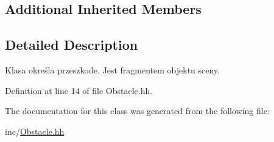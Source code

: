 \subsection*{Additional Inherited Members}


\subsection{Detailed Description}
Klasa określa przeszkode. Jest fragmentem objektu sceny. 

Definition at line 14 of file Obstacle.\+hh.



The documentation for this class was generated from the following file\+:\begin{DoxyCompactItemize}
\item 
inc/\hyperlink{_obstacle_8hh}{Obstacle.\+hh}\end{DoxyCompactItemize}
